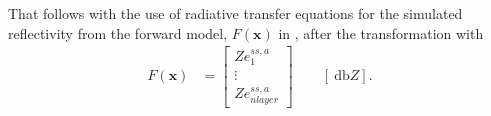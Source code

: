 That follows with the use of radiative transfer equations for the simulated reflectivity from the forward model, $F(\mathbf{x})$ in , after the transformation with 
\begin{align}
	F(\mathbf{x}) & = \begin{bmatrix} 
		Ze^{ss,a}_1 \\
		\vdots \\
		Ze^{ss,a}_{nlayer}
	\end{bmatrix} \qquad [\SI{}{\decibel Z}]. \label{eq:forward_model}
\end{align}



